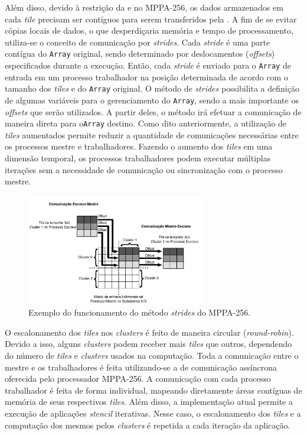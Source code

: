 \documentclass[12pt]{article}
\newcommand{\mppa}{MPPA-256\xspace}
\newcommand{\stencil}{\textit{stencil}\xspace}
\begin{document}
Além disso, devido à restrição da \api e \noc no \mppa, os dados armazenados em
cada \textit{tile} precisam ser contíguos para serem transferidos pela \noc. A
fim de se evitar cópias locais de dados, o que desperdiçaria memória e tempo de
processamento, utiliza-se o conceito de comunicação por \textit{strides}. Cada
\textit{stride} é uma parte contígua do \texttt{Array} original, sendo
determinado por deslocamentos (\textit{offsets}) especificados durante a
execução. Então, cada \textit{stride} é enviado para o \texttt{Array} de entrada
em um processo trabalhador na posição determinada de acordo com o tamanho dos
\textit{tiles} e do \texttt{Array} original. O método de \textit{strides}
possibilita a definição de algumas variáveis para o gerenciamento do
\texttt{Array}, sendo a mais importante os \textit{offsets} que serão
utilizados. A partir deles, o método irá efetuar a comunicação de maneira direta
para o\texttt{Array} destino. Como dito anteriormente, a utilização de
\textit{tiles} aumentados permite reduzir a quantidade de comunicações
necessárias entre os processos mestre e trabalhadores. Fazendo o aumento dos
\textit{tiles} em uma dimensão temporal, os processos trabalhadores podem executar
múltiplas iterações sem a necessidade de comunicação ou sincronização com o
processo mestre.

\begin{figure}[t]
	\centering
	\includegraphics[width=0.7\textwidth]{figs/stridesImage.pdf}
	\caption{Exemplo do funcionamento do método \textit{strides} do \mppa.}
	\label{fig:strides}
\end{figure}

O escalonamento dos \textit{tiles} nos \textit{clusters} é feito de maneira
circular (\textit{round-robin}). Devido a isso, alguns \textit{clusters} podem
receber mais \textit{tiles} que outros, dependendo do número de \textit{tiles} e
\textit{clusters} usados na computação. Toda a comunicação entre o mestre e os
trabalhadores é feita utilizando-se a \api de comunicação assíncrona oferecida pelo
processador \mppa. A comunicação com cada processo trabalhador é feita de forma
individual, mapeando diretamente áreas contíguas de memória de seus respectivos
\textit{tiles}. Além disso, a implementação atual permite a execução de
aplicações \stencil iterativas. Nesse caso, o escalonamento dos \textit{tiles} e
a computação dos mesmos pelos \textit{clusters} é repetida a cada iteração da
aplicação.
\end{document}
